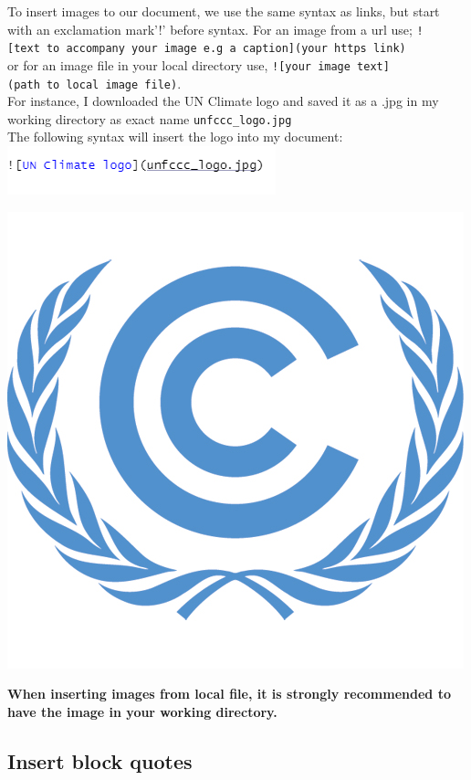 \documentclass[
]{book}
\let\origfigure\figure
\let\endorigfigure\endfigure
\renewenvironment{figure}[1][2] {
    \expandafter\origfigure\expandafter[H]
} {
    \endorigfigure
}
\begin{document}
To insert images to our document, we use the same syntax as links, but start with an exclamation mark'!' before syntax.
For an image from a url use; \texttt{!{[}text\ to\ accompany\ your\ image\ e.g\ a\ caption{]}(your\ https\ link)}\\
or for an image file in your local directory use, \texttt{!{[}your\ image\ text{]}(path\ to\ local\ image\ file)}.\\
For instance, I downloaded the UN Climate logo and saved it as a .jpg in my working directory as exact name \texttt{unfccc\_logo.jpg}\\
The following syntax will insert the logo into my document:\\
\includegraphics{tutorial_screenshots/insert_image.png}

\begin{figure}
\centering
\includegraphics{unfccc_logo.jpg}
\caption{UN Climate logo}
\end{figure}

\textbf{When inserting images from local file, it is strongly recommended to have the image in your working directory.}

\hypertarget{insert-block-quotes}{%
\subsection{Insert block quotes}\label{insert-block-quotes}}
\end{document}
